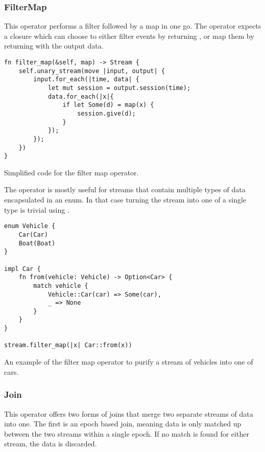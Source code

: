 \subsubsection{FilterMap}
This operator performs a filter followed by a map in one go. The operator expects a closure which can choose to either filter events by returning , or map them by returning  with the output data.

\begin{listing}[H]
\begin{verbatim}
fn filter_map(&self, map) -> Stream {
    self.unary_stream(move |input, output| {
        input.for_each(|time, data| {
            let mut session = output.session(time);
            data.for_each(|x|{
                if let Some(d) = map(x) {
                    session.give(d);
                }
            });
        });
    })
}
\end{verbatim}
  \caption{Simplified code for the filter map operator.}
  \label{lst:filtermap}
\end{listing}

The operator is mostly useful for streams that contain multiple types of data encapsulated in an enum. In that case turning the stream into one of a single type is trivial using .

\begin{listing}[H]
\begin{verbatim}
enum Vehicle {
    Car(Car)
    Boat(Boat)
}

impl Car { 
    fn from(vehicle: Vehicle) -> Option<Car> {
        match vehicle {
            Vehicle::Car(car) => Some(car),
            _ => None
        }
    }
}

stream.filter_map(|x| Car::from(x))
\end{verbatim}
\caption{An example of the filter map operator to purify a stream of vehicles into one of cars.}
\label{lst:filtermap-example}
\end{listing}

\subsubsection{Join}
This operator offers two forms of joins that merge two separate streams of data into one. The first is an epoch based join, meaning data is only matched up between the two streams within a single epoch. If no match is found for either stream, the data is discarded.

